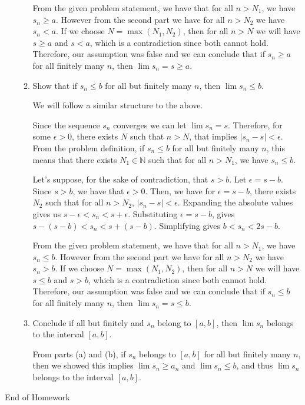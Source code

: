 \documentclass [10pt]{article}
\newcommand{\jg}[1]{{\color{blue} #1}}
\begin{document}
\begin{enumerate}
\begin{enumerate}
{From the given problem statement, we have that for all $n > N_1$, we have $s_n \geq a$. However from the second part we have for all $n > N_2$ we have $s_n < a$. If we choose $N = \max(N_1, N_2)$, then for all $n > N$ we will have $s \geq a$ and $s < a$, which is a contradiction since both cannot hold. Therefore, our assumption was false and we can conclude that if $s_n \geq a$ for all finitely many $n$, then $\lim s_n = s \geq a$. 
}

\item Show that if $s_n \leq b$ for all but finitely many $n$, then $\lim
s_n \leq b$.

\jg{
We will follow a similar structure to the above. 

Since the sequence $s_n$ converges we can let $\lim s_n = s$. Therefore, for some $\epsilon > 0$, there exists $N$ such that $n > N$, that implies $|s_n - s| < \epsilon$. From the problem definition, if $s_n \leq b$ for all but finitely many $n$, this means that there exists $N_1 \in \mathbb{N}$ such that for all $n > N_1$, we have $s_n \leq b$. 

Let's suppose, for the sake of contradiction, that $s > b$. Let $\epsilon = s - b$. Since $s > b$, we have that $\epsilon > 0$. Then, we have for $\epsilon = s - b$, there exists $N_2$ such that for all $n > N_2$, $|s_n - s | < \epsilon$. Expanding the absolute values gives us $s - \epsilon < s_n < s + \epsilon$. Substituting $\epsilon = s - b$, gives $s - (s - b) < s_n < s + (s - b)$. Simplifying gives $b < s_n < 2s - b$. 

From the given problem statement, we have that for all $n > N_1$, we have $s_n \leq b$. However from the second part we have for all $n > N_2$ we have $s_n > b$. If we choose $N = \max(N_1, N_2)$, then for all $n > N$ we will have $s \leq b$ and $s > b$, which is a contradiction since both cannot hold. Therefore, our assumption was false and we can conclude that if $s_n \leq b$ for all finitely many $n$, then $\lim s_n = s \leq b$.
}

\item Conclude if all but finitely and $s_n$ belong to $[a, b]$, then $\lim
s_n$ belongs to the interval $[a, b].$

\jg{
From parts (a) and (b), if $s_n$ belongs to $[a,b]$ for all but finitely many $n$, then we showed this implies $\lim s_n \geq a_n$ and $\lim s_n \leq b$, and thus $\lim s_n$ belongs to the interval $[a,b]$. 
}
\end{enumerate}
\end{enumerate}

\clearpage
\begin{center}
\vspace*{\fill}
{\Large End of Homework}
\vspace*{\fill}
\end{center}
\end{document}
